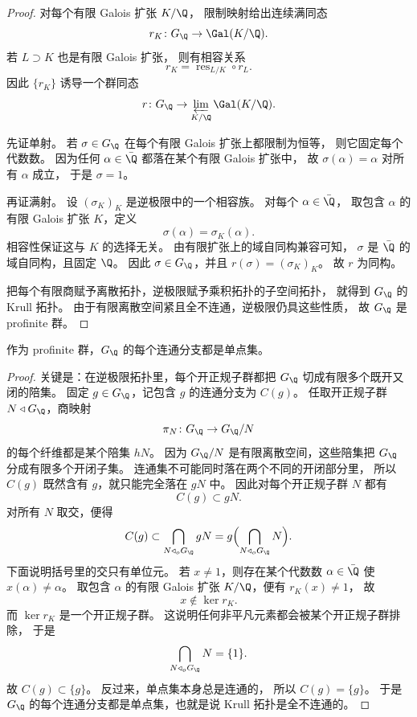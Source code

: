 \begin{proof}
对每个有限 Galois 扩张 $K/\Q$，
限制映射给出连续满同态
\[
  r_K\colon G_\Q\to \Gal(K/\Q).
\]
若 $L\supset K$ 也是有限 Galois 扩张，
则有相容关系
\[
  r_K=\operatorname{res}_{L/K}\circ r_L.
\]
因此 $\{r_K\}$ 诱导一个群同态
\[
  r\colon G_\Q\to \varprojlim_{K/\Q}\Gal(K/\Q).
\]

先证单射。
若 $\sigma\in G_\Q$ 在每个有限 Galois 扩张上都限制为恒等，
则它固定每个代数数。
因为任何 $\alpha\in\bar\Q$ 都落在某个有限 Galois 扩张中，
故 $\sigma(\alpha)=\alpha$ 对所有 $\alpha$ 成立，
于是 $\sigma=1$。

再证满射。
设 $(\sigma_K)_K$ 是逆极限中的一个相容族。
对每个 $\alpha\in\bar\Q$，
取包含 $\alpha$ 的有限 Galois 扩张 $K$，定义
\[
  \sigma(\alpha)=\sigma_K(\alpha).
\]
相容性保证这与 $K$ 的选择无关。
由有限扩张上的域自同构兼容可知，
$\sigma$ 是 $\bar\Q$ 的域自同构，且固定 $\Q$。
因此 $\sigma\in G_\Q$，并且 $r(\sigma)=(\sigma_K)_K$。
故 $r$ 为同构。

把每个有限商赋予离散拓扑，逆极限赋予乘积拓扑的子空间拓扑，
就得到 $G_\Q$ 的 Krull 拓扑。
由于有限离散空间紧且全不连通，逆极限仍具这些性质，
故 $G_\Q$ 是 profinite 群。
\end{proof}

\begin{lemma}
\label{lem:ch09-krull-totally-disconnected}
作为 profinite 群，$G_\Q$ 的每个连通分支都是单点集。
\end{lemma}

\begin{proof}
关键是：在逆极限拓扑里，每个开正规子群都把 $G_\Q$ 切成有限多个既开又闭的陪集。
固定 $g\in G_\Q$，记包含 $g$ 的连通分支为 $C(g)$。
任取开正规子群 $N\triangleleft G_\Q$，商映射
\[
  \pi_N\colon G_\Q\to G_\Q/N
\]
的每个纤维都是某个陪集 $hN$。
因为 $G_\Q/N$ 是有限离散空间，这些陪集把 $G_\Q$ 分成有限多个开闭子集。
连通集不可能同时落在两个不同的开闭部分里，
所以 $C(g)$ 既然含有 $g$，就只能完全落在 $gN$ 中。
因此对每个开正规子群 $N$ 都有
\[
  C(g)\subset gN.
\]
对所有 $N$ 取交，便得
\[
  C(g)\subset \bigcap_{N\triangleleft_o G_\Q} gN
  =g\Bigl(\bigcap_{N\triangleleft_o G_\Q}N\Bigr).
\]
下面说明括号里的交只有单位元。
若 $x\neq 1$，则存在某个代数数 $\alpha\in \bar\Q$ 使 $x(\alpha)\neq \alpha$。
取包含 $\alpha$ 的有限 Galois 扩张 $K/\Q$，便有 $r_K(x)\neq 1$，
故
\[
  x\notin \ker r_K.
\]
而 $\ker r_K$ 是一个开正规子群。
这说明任何非平凡元素都会被某个开正规子群排除，
于是
\[
  \bigcap_{N\triangleleft_o G_\Q}N=\{1\}.
\]
故 $C(g)\subset \{g\}$。
反过来，单点集本身总是连通的，
所以 $C(g)=\{g\}$。
于是 $G_\Q$ 的每个连通分支都是单点集，也就是说 Krull 拓扑是全不连通的。 \qedhere
\end{proof}

